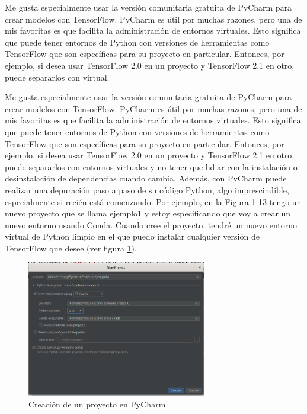 Me gusta especialmente usar la versión comunitaria gratuita de PyCharm para crear modelos con TensorFlow. PyCharm es útil por muchas razones, pero una de mis favoritas es que facilita la administración de entornos virtuales. Esto significa que puede tener entornos de Python con versiones de herramientas como TensorFlow que son específicas para su proyecto en particular. Entonces, por ejemplo, si desea usar TensorFlow 2.0 en un proyecto y TensorFlow 2.1 en otro, puede separarlos con virtual.

Me gusta especialmente usar la versión comunitaria gratuita de PyCharm para crear modelos con TensorFlow. PyCharm es útil por muchas razones, pero una de mis favoritas es que facilita la administración de entornos virtuales. Esto significa que puede tener entornos de Python con versiones de herramientas como TensorFlow que son específicas para su proyecto en particular. Entonces, por ejemplo, si desea usar TensorFlow 2.0 en un proyecto y TensorFlow 2.1 en otro, puede separarlos con entornos virtuales y no tener que lidiar con la instalación o desinstalación de dependencias cuando cambia. Además, con PyCharm puede realizar una depuración paso a paso de su código Python, algo imprescindible, especialmente si recién está comenzando. Por ejemplo, en la Figura 1-13 tengo un nuevo proyecto que se llama ejemplo1 y estoy especificando que voy a crear un nuevo entorno usando Conda. Cuando cree el proyecto, tendré un nuevo entorno virtual de Python limpio en el que puedo instalar cualquier versión de TensorFlow que desee (ver figura \ref{cap3:002}).

\begin{figure}[htb]
	\centering
	\includegraphics[width=0.7\textwidth]{capitulo3/creacion.png}
	\caption{Creación de un proyecto en PyCharm}
	\label{cap3:002}
\end{figure}

